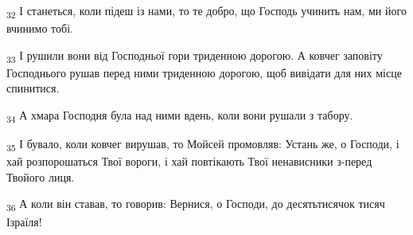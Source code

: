 \begin{tcolorbox}
\textsubscript{32} І станеться, коли підеш із нами, то те добро, що Господь учинить нам, ми його вчинимо тобі.
\end{tcolorbox}
\begin{tcolorbox}
\textsubscript{33} І рушили вони від Господньої гори триденною дорогою. А ковчег заповіту Господнього рушав перед ними триденною дорогою, щоб вивідати для них місце спинитися.
\end{tcolorbox}
\begin{tcolorbox}
\textsubscript{34} А хмара Господня була над ними вдень, коли вони рушали з табору.
\end{tcolorbox}
\begin{tcolorbox}
\textsubscript{35} І бувало, коли ковчег вирушав, то Мойсей промовляв: Устань же, о Господи, і хай розпорошаться Твої вороги, і хай повтікають Твої ненависники з-перед Твойого лиця.
\end{tcolorbox}
\begin{tcolorbox}
\textsubscript{36} А коли він ставав, то говорив: Вернися, о Господи, до десятьтисячок тисяч Ізраїля!
\end{tcolorbox}
